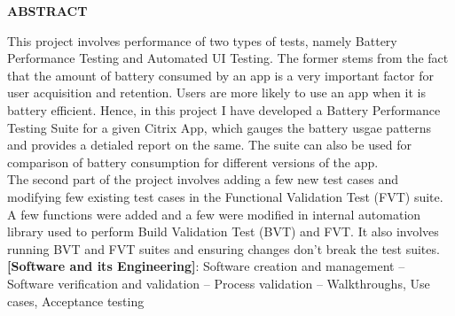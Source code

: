 \setlength\parindent{0pt}
\begin{center}
\large{\textbf{ABSTRACT}}\\
\vspace{1cm}
\end{center}
This project involves performance of two types of tests, namely Battery Performance Testing and Automated UI Testing. The former stems from the fact that the amount of battery consumed by an app is a very important factor for user acquisition and retention. Users are more likely to use an app when it is battery efficient. Hence, in this project I have developed a Battery Performance Testing Suite for a given Citrix App, which gauges the battery usgae patterns and provides a detialed report on the same. The suite can also be used for comparison of battery consumption for different versions of the app.\\

The second part of the project involves adding a few new test cases and modifying few existing test cases in the Functional Validation Test (FVT) suite. A few functions were added and a few were modified in internal automation library used to perform Build Validation Test (BVT) and FVT. It also involves running BVT and FVT suites and ensuring changes don't break the test suites.\\

\textbf{[Software and its Engineering]}:   Software creation and management -- Software verification and validation --  Process validation -- Walkthroughs, Use cases, Acceptance testing